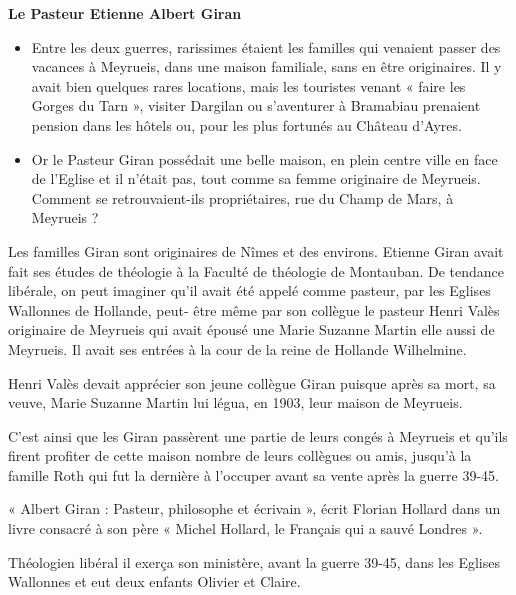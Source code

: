 
\begin{center}
{\Large\bfseries Le Pasteur Etienne Albert Giran}
\end{center}

\begin{itemize}
\item Entre les deux guerres, rarissimes étaient les familles qui venaient passer des vacances
à Meyrueis, dans une maison familiale, sans en être originaires. Il y avait bien
quelques rares locations, mais les touristes venant « faire les Gorges du Tarn », visiter
Dargilan ou s’aventurer à Bramabiau prenaient pension dans les hôtels ou, pour les
plus fortunés au Château d’Ayres.

\item Or le Pasteur Giran possédait une belle maison, en plein centre ville en face de
l’Eglise et il n’était pas, tout comme sa femme originaire de Meyrueis. Comment se
retrouvaient-ils propriétaires, rue du Champ de Mars, à Meyrueis ?
\end{itemize}

Les familles Giran sont originaires de Nîmes et des environs. Etienne Giran avait fait ses
études de théologie à la Faculté de théologie de Montauban. De tendance libérale, on peut
imaginer qu’il avait été appelé comme pasteur, par les Eglises Wallonnes de Hollande, peut-
être même par son collègue le pasteur Henri Valès originaire de Meyrueis qui avait épousé
une Marie Suzanne Martin elle aussi de Meyrueis. Il avait ses entrées à la cour de la reine de
Hollande Wilhelmine.

Henri Valès devait apprécier son jeune collègue Giran puisque après sa mort, sa veuve, Marie
Suzanne Martin lui légua, en 1903, leur maison de Meyrueis.

C’est ainsi que les Giran passèrent une partie de leurs congés à Meyrueis et qu’ils firent
profiter de cette maison nombre de leurs collègues ou amis, jusqu’à la famille Roth qui fut la
dernière à l’occuper avant sa vente après la guerre 39-45.

\vspace{1em}

« Albert Giran : Pasteur, philosophe et écrivain », écrit Florian Hollard dans un livre consacré
à son père « Michel Hollard, le Français qui a sauvé Londres ».

Théologien libéral il exerça son ministère, avant la guerre 39-45, dans les Eglises Wallonnes
et eut deux enfants Olivier et Claire.

